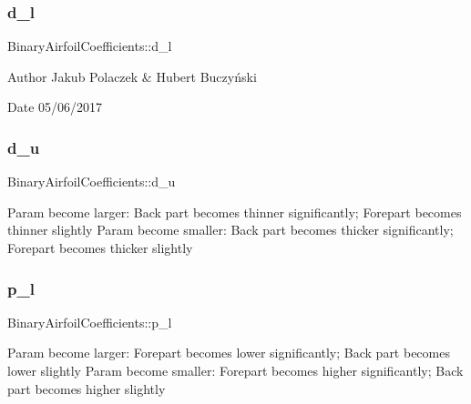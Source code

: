\subsubsection{\texorpdfstring{d\+\_\+l}{d\_l}}
{\footnotesize\ttfamily Binary\+Airfoil\+Coefficients\+::d\+\_\+l}

\begin{DoxyAuthor}{Author}
Jakub Polaczek \& Hubert Buczyński 
\end{DoxyAuthor}
\begin{DoxyDate}{Date}
05/06/2017 
\end{DoxyDate}
\hypertarget{struct_binary_airfoil_coefficients_a9640283446988bbdb012e94aaf2a41a3}{}\label{struct_binary_airfoil_coefficients_a9640283446988bbdb012e94aaf2a41a3} 
\subsubsection{\texorpdfstring{d\+\_\+u}{d\_u}}
{\footnotesize\ttfamily Binary\+Airfoil\+Coefficients\+::d\+\_\+u}

Param become larger\+: Back part becomes thinner significantly; Forepart becomes thinner slightly Param become smaller\+: Back part becomes thicker significantly; Forepart becomes thicker slightly \hypertarget{struct_binary_airfoil_coefficients_a9474385e776695d50b75914ff62bd37a}{}\label{struct_binary_airfoil_coefficients_a9474385e776695d50b75914ff62bd37a} 
\subsubsection{\texorpdfstring{p\+\_\+l}{p\_l}}
{\footnotesize\ttfamily Binary\+Airfoil\+Coefficients\+::p\+\_\+l}

Param become larger\+: Forepart becomes lower significantly; Back part becomes lower slightly Param become smaller\+: Forepart becomes higher significantly; Back part becomes higher slightly \hypertarget{struct_binary_airfoil_coefficients_adc5da813d292a991f0e038348ff26ae1}{}\label{struct_binary_airfoil_coefficients_adc5da813d292a991f0e038348ff26ae1} 
